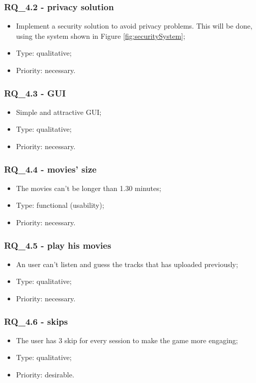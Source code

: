\subsubsection{RQ\_4.2 - privacy solution}
	\begin{itemize}
		\item Implement a security solution to avoid privacy problems. This will be done, using the system shown in Figure \ref{fig:securitySystem};
		\item Type: qualitative;
		\item Priority: necessary.
	\end{itemize}
\subsubsection{RQ\_4.3 - GUI}
	\begin{itemize}
		\item Simple and attractive GUI;
		\item Type: qualitative; 
		\item Priority: necessary.
	\end{itemize}
\subsubsection{RQ\_4.4 - movies' size}
	\begin{itemize}
		\item The movies can't be longer than 1.30 minutes;
		\item Type: functional (usability);
		\item Priority: necessary.
	\end{itemize}
\subsubsection{RQ\_4.5 - play his movies}
	\begin{itemize}
		\item An user can't listen and guess the tracks that has uploaded previously;
		\item Type: qualitative;
		\item Priority: necessary.
	\end{itemize}
\subsubsection{RQ\_4.6 - skips}
	\begin{itemize}
		\item The user has 3 skip for every session to make the game more engaging;
		\item Type: qualitative;
		\item Priority: desirable.
	\end{itemize}
